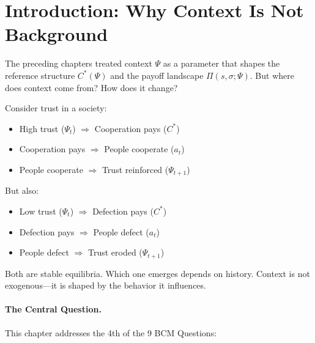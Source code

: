 
\section{Introduction: Why Context Is Not Background}
\label{sec:context-intro}


The preceding chapters treated context $\Psi$ as a parameter that shapes
the reference structure $C^*(\Psi)$ and the payoff landscape $\Pi(s, \sigma; \Psi)$.
But where does context come from? How does it change?

\begin{intuition}
Consider trust in a society:
\begin{itemize}[nosep]
  \item High trust ($\Psi_t$) $\Rightarrow$ Cooperation pays ($C^*$)
  \item Cooperation pays $\Rightarrow$ People cooperate ($a_t$)
  \item People cooperate $\Rightarrow$ Trust reinforced ($\Psi_{t+1}$)
\end{itemize}
But also:
\begin{itemize}[nosep]
  \item Low trust ($\Psi_t$) $\Rightarrow$ Defection pays ($C^*$)
  \item Defection pays $\Rightarrow$ People defect ($a_t$)
  \item People defect $\Rightarrow$ Trust eroded ($\Psi_{t+1}$)
\end{itemize}
Both are stable equilibria. Which one emerges depends on history.
Context is not exogenous---it is shaped by the behavior it influences.
\end{intuition}

\paragraph{The Central Question.}
This chapter addresses the 4th of the 9 BCM Questions:

\begin{center}
\end{center}

